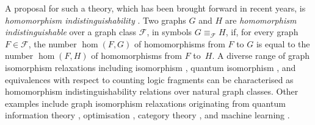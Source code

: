 \documentclass[11pt]{scrartcl}
\theoremstyle{definition}
\theoremstyle{plain}
\theoremstyle{remark}
\begin{document}
	A proposal for such a theory, which has been brought forward in recent years, is 
	\emph{homomorphism indistinguishability} \cite{seppelt_homomorphism_2024}.
	Two graphs $G$ and $H$ are \emph{homomorphism indistinguishable} over a graph class $\mathcal{F}$,
	in symbols $G \equiv_{\mathcal{F}} H$,
	if, for every graph $F \in \mathcal{F}$, the number $\hom(F, G)$ of homomorphisms 
	from $F$ to $G$ is equal to the number $\hom(F, H)$ of homomorphisms from $F$ to~$H$.
	A diverse range of graph isomorphism relaxations including isomorphism \cite{lovasz_operations_1967}, 
	quantum isomorphism \cite{mancinska_quantum_2020},
	and
	equivalences with respect to counting logic fragments \cite{dvorak_recognizing_2010,dell_lovasz_2018,schindling_homomorphism_2025,montacute_pebble-relation_2024,dawar_lovasz-type_2021,adler_going_2026}
	can be characterised as homomorphism indistinguishability relations over natural graph classes.
	Other examples include graph isomorphism relaxations originating from quantum information theory \cite{mancinska_quantum_2020,seppelt_quantum_2025}, optimisation \cite{kar_npa_2026,roberson_lasserre_2024}, category theory \cite{dawar_lovasz-type_2021,abramsky_discrete_2022}, and machine learning \cite{zhang_beyond_2024,gai_homomorphism_2025}.
\end{document}
